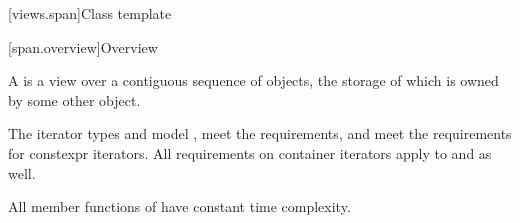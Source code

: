 [views.span]{Class template }

[span.overview]{Overview}

\pnum
{}%
A  is a view over a contiguous sequence of objects,
the storage of which is owned by some other object.

\pnum
The iterator types  and 
model ,
meet the 
requirements,
and
meet the requirements for
constexpr iterators.
All requirements on container iterators apply to
 and  as well.

\pnum
All member functions of  have constant time complexity.

